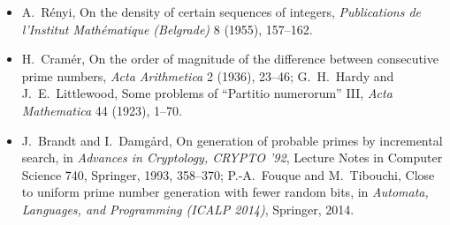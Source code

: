 \begin{itemize}
\item A.~R\'enyi, On the density of certain sequences of integers, \emph{Publications de l'Institut Math\'ematique (Belgrade)} 8 (1955), 157--162.
\item H.~Cram\'er, On the order of magnitude of the difference between consecutive prime numbers, \emph{Acta Arithmetica} 2 (1936), 23--46; G.~H.~Hardy and J.~E.~Littlewood, Some problems of
``Partitio numerorum'' III, \emph{Acta Mathematica} 44 (1923), 1--70.
\item J.~Brandt and I.~Damg\aa rd, On generation of probable primes by incremental search, in \emph{Advances in Cryptology, CRYPTO '92}, Lecture Notes in Computer Science 740, Springer, 1993,
358--370; P.-A.~Fouque and M.~Tibouchi, Close to uniform prime number generation with fewer random bits, in \emph{Automata, Languages, and Programming (ICALP 2014)}, Springer, 2014.
\end{itemize}
